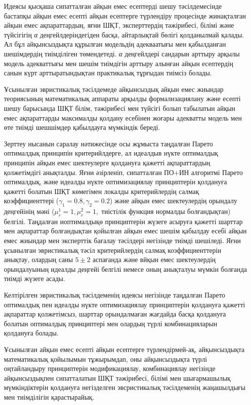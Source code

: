 \begin{multicols}{2}
Идеясы қысқаша сипатталған айқын емес есептерді шешу тәсілдемесінде
бастапқы айқын емес есепті айқын есептерге түрлендіру процесінде
жинақталған айқын емес ақпараттардың, яғни ШҚТ, эксперттердің
тәжірибесі, білімі және түйсігігің \emph{α} деңгейлдеріндегіден басқа,
айтарлықтай бөлігі қолданылмай қалады. Ал бұл айқынсыздықта құрылған
модельдің адекваатығы мен қабылданған шешімдердің тиімділіген
төмендетеді. \emph{α} деңгейлдері сандарын арттыру арқылы модель
адекваттығы мен шешім тиімдігін арттыру алынған айқын есептердің санын
күрт арттыратындықтан практикалық тұрғыдан тиімсіз болады.

Ұсынылған эвристикалық тәсілдемеде айқынсыздық айқын емес жиындар
теориясының математикалық аппараты арқылды формализациялану және есепті
шешу барысында ШҚТ білім, тәжірибесі мен түйсігі болып табылатын айқын
емес ақпараттарды максималды қолдану есебінен жоғары адекватты модель
мен өте тиімді шешшімдер қабылдауға мүмкіндік береді.

Зерттеу нысанын саралау нәтижесінде осы жұмыста таңдалған Парето
оптималдық принципін критерийлдерге, ал идеалдыв нүкте оптималдық
принципін айқын емес шектеулерге қолдануға қажетті ақпараттардың
қолжетімдігі анықталды. Яғни әзірленіп, сипатталған ПО+ИН алгоритмі
Парето оптималдық, және идеалды нүкте оптимизациялау принциптерін
қолдануға қажетті болатын ШҚТ көмегімен локалды критерийлердің салмақ
коэффициенттері ($\gamma_1=0.8,\gamma_2=0.2$) және айқын емес
шектеулердің орындалу деңгейінің мәні
($\mu_r^1=1,\mu_r^2=1,$ тиістілік функция нормалды
болғандықтан) белгілі. Таңдалған иоптималдықө принциптерін жүзеге
асыруға қажетті шарттар мен ақпараттар болғандықтан қойылған айқын емес
шешім қабылдау есебі айқын емес жиындар мен эксперттік бағалау тәсілдері
негізінде тиімді шешіледі. Яғни ұсынылған эвристикалық тәсіл
критерийлердің салмақ коэффициенттерін анықтау, олардың саны
$5\pm2$ аспағанда және вйқын емес
шектеулердің орындалуының идеалды деңгейі белгілі немесе оның анықталуы
мүмкін болғанда тиімді жүзеге асады.

Келтірілген эвристикалық тәсілдеменің идеясы негізінде таңдалған Парето
оптималдық пен идеалды нүкте оптимизациялау принциптерін қолдануға
қажетті ақпараттар қолжетімсыз, шарттар орындалмаған жағдайда басқа
қолдануға болатын оптималдық принциптері мен олардың түрлі
комбинацияларын қолдануға болады.

Ұсынылған айқын емес есепті айқын есептерге түрлендірмей-ақ,
айқынсыздықта математикалық қойылымын тұжырымдап, оны айқынсыздықта
түрлі оңтайландыру принциптерін модификациялау, комбинациялау негізінде
айқынсыздықпен сипатталатын ШҚТ тәжірибесі, білімі мен шығармашылық
мүмкіндіктерін қолдануға негізделген эвсристикалық тәсілдеменің
жаңашылдығы мен тиімділігін қарастырайық.


\end{multicols}
